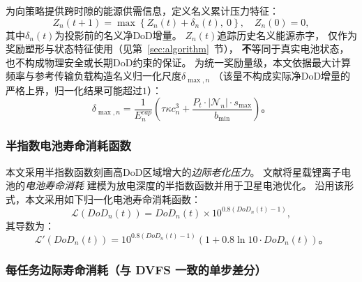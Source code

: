 \documentclass[a4paper,11pt]{article}
\begin{document}
为向策略提供跨时隙的能源供需信息，定义名义累计压力特征：
\begin{equation}
    Z_n(t+1) = \max\left\{Z_n(t) + \delta_n(t),\ 0\right\},
    \quad Z_n(0)=0,
    \label{eq:virtual_queue}
\end{equation}
其中$\delta_n(t)$为投影前的名义净DoD增量。
$Z_n(t)$追踪历史名义能源赤字，
仅作为奖励塑形与状态特征使用（见第~\ref{sec:algorithm}~节），
\textbf{不}等同于真实电池状态，
也不构成物理安全或长期DoD约束的保证。
为统一奖励量级，本文依据最大计算频率与参考传输负载构造名义归一化尺度$\delta_{\max,n}$
（该量不构成实际净DoD增量的严格上界，归一化结果可能超过$1$）：
\begin{equation}
    \delta_{\max,n} = \frac{1}{E^{cap}_n}\left(
    \tau \kappa c^3_n
    + \frac{P_t \cdot |\mathcal{N}_n| \cdot s_{\max}}{b_{\min}}
    \right)。
    \label{eq:delta_max}
\end{equation}

\subsubsection{半指数电池寿命消耗函数}

本文采用半指数函数刻画高DoD区域增大的\emph{边际老化压力}。
文献\cite{chen2025tasri}将星载锂离子电池的\emph{电池寿命消耗}
建模为放电深度的半指数函数并用于卫星电池优化。
沿用该形式，本文采用如下归一化电池寿命消耗函数：
\begin{equation}
    \mathcal{L}(DoD_n(t)) = DoD_n(t) \times
    10^{0.8(DoD_n(t)-1)},
    \label{eq:health_loss}
\end{equation}
其导数为：
\begin{equation}
    \mathcal{L}'(DoD_n(t)) = 10^{0.8(DoD_n(t)-1)}
    \left(1 + 0.8\ln 10 \cdot DoD_n(t)\right)。
    \label{eq:health_loss_deriv}
\end{equation}

\subsubsection{每任务边际寿命消耗（与 DVFS 一致的单步差分）}
\end{document}
